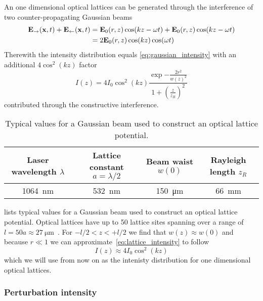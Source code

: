 An one dimensional optical lattices can be generated through the interference
of two counter-propagating Gaussian beams
\begin{align*}
  \vb{E}_\rightarrow(\vb{x},t)+\vb{E}_\leftarrow(\vb{x},t)
  &=
  \vb{E}_0(r,z)\cos(kz-\omega t)+\vb{E}_0(r,z)\cos(kz-\omega t)\\
  &=
  2\vb{E}_0(r,z)\cos(kz)\cos(\omega t)
\end{align*}
Therewith the intensity distribution equals
\cref{eq:gaussian_intensity} with an additional $4\cos^2(kz)$ factor
\begin{equation}
  I(z)
  =
  4I_0\cos^2(kz)
  \frac{\exp{-\frac{2r^2}{w{(z)}^2}}}{1+{\left(\frac{z}{z_R}\right)}^2}
  \label{eq:lattice_intensity}
\end{equation}
contributed through the constructive interference.
\begin{table}[ht]
  \centering
  \begin{tabular}{|c|c|c|c|}
    \hline
    Laser wavelength $\lambda$ &
    Lattice constant $a=\lambda/2$ &
    Beam waist $w(0)$ &
    Rayleigh length $z_R$ \\
    \hline
    \SI{1064}{\nano\meter} &
    \SI{532}{\nano\meter} &
    \SI{150}{\micro\meter} &
    \SI{66}{\milli\meter} \\
    \hline
  \end{tabular}
  \captionsetup{width=.8\textwidth}
  \caption{Typical values for a Gaussian beam used to construct an optical
    lattice potential.
  }\label{tab:gaussian_beam_lattice}
\end{table}
 lists typical values for a Gaussian beam
used to construct an optical lattice potential. Optical lattices have up to
50 lattice sites spanning over a range of
$l=50a\approx\SI{27}{\micro\meter}$~\cite{Rom2009}. For $-l/2<z<+l/2$ we find
that $w(z)\approx w(0)$ and because
$r\ll1$ we can approximate~\cref{eq:lattice_intensity} to follow
\begin{equation}
  I(z)
  \approx
  4I_0\cos^2(kz)
  \label{eq:gaussian_intensity_approx}
\end{equation}
which we will use from now on as the intenisty distribution for one
dimensional optical lattices.

\subsubsection{Perturbation intensity}

